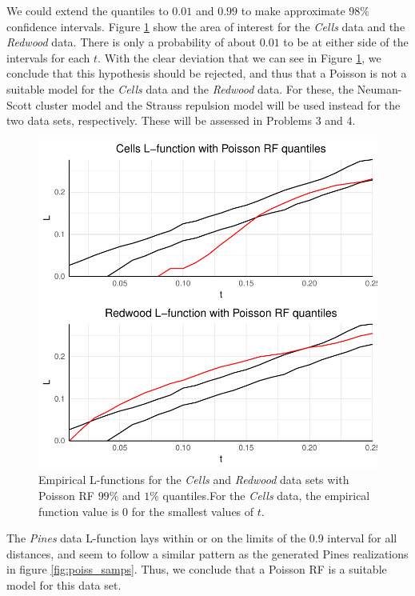 We could extend the quantiles to $0.01$ and $0.99$ to make approximate $98\%$ confidence intervals. Figure \ref{fig:poiss_quantiles2} show the area of interest for the \textit{Cells} data and the \textit{Redwood} data. There is only a probability of about $0.01$ to be at either side of the intervals for each $t$. With the clear deviation that we can see in Figure \ref{fig:poiss_quantiles2}, we conclude that this hypothesis should be rejected, and thus that a Poisson is not a suitable model for the \textit{Cells} data and the \textit{Redwood} data. For these, the Neuman-Scott cluster model and the Strauss repulsion model will be used instead for the two data sets, respectively. These will be assessed in Problems 3 and 4. 

\begin{figure}
    \centering
    \includegraphics[scale=0.95]{figures/prob1_quantiles2.pdf}
    \caption{Empirical L-functions for the \textit{Cells} and \textit{Redwood} data sets with Poisson RF $99\%$ and $1\%$ quantiles.For the \textit{Cells} data, the empirical function value is $0$ for the smallest values of $t$.}
    \label{fig:poiss_quantiles2}
\end{figure}

The \textit{Pines} data L-function lays within or on the limits of the $0.9$ interval for all distances, and seem to follow a similar pattern as the generated Pines realizations in figure \ref{fig:poiss_samps}. Thus, we conclude that a Poisson RF is a suitable model for this data set.